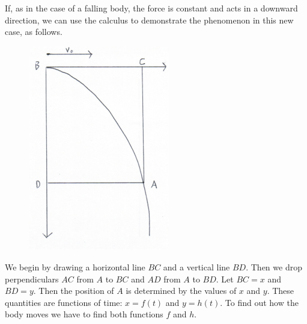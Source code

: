 \documentclass[polutonikogreek,english,twoside,openright]{article}
\begin{document}
If, as in the case of a falling body, the force is constant and acts
in a downward direction, we can use the calculus to demonstrate the
phenomenon in this new case, as follows.
\begin{figure}[htp]
  \begin{center}
    \includegraphics[width=0.55\textwidth]{fig/Figure81}
    \caption{}
  \end{center}
\end{figure}

We begin by drawing a horizontal line $BC$ and a vertical line $BD$.
Then we drop perpendiculars $AC$ from $A$ to $BC$ and $AD$ from $A$ to
$BD$.  Let $BC = x$ and $BD = y$.  Then the position of $A$ is
determined by the values of $x$ and $y$.  These quantities are
functions of time: $x =f(t)$ and $y =h(t)$.  To find out how the body
moves we have to find both functions $f$ and $h$.
\end{document}
